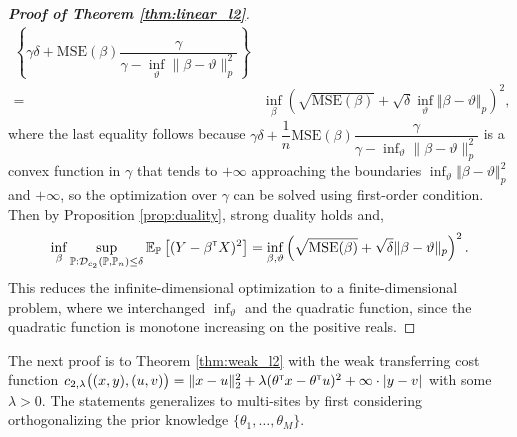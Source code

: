 \documentclass[12pt]{article}
\begin{document}
\begin{proof}[\textbf{Proof of Theorem \ref{thm:linear_l2}}]
\begin{align*}
\left\{
\gamma \delta + \text{MSE}(\beta) \dfrac{ \gamma}{\gamma - \inf_\vartheta \lVert \beta - \vartheta \rVert_p^2}
\right\}\\
=&\inf_\beta \left(\sqrt{\text{MSE}(\beta)} + \sqrt{\delta}\inf_\vartheta \Vert \beta-\vartheta\Vert_p\right)^2,
\end{align*}where the last equality follows because $\gamma \delta + \dfrac{1}{n} \text{MSE}(\beta) \dfrac{ \gamma}{\gamma - \inf_\vartheta \lVert \beta - \vartheta \rVert_p^2}$ is a convex function in $\gamma$ that tends to $+\infty$ approaching the boundaries $\inf_\vartheta \Vert \beta-\vartheta\Vert_p^2$ and $+\infty$, so the optimization over $\gamma$ can be solved using first-order condition. Then by Proposition \ref{prop:duality}, strong duality holds and, \[\inf_{\beta} \sup_{\mathbb{P}:\mathcal{D}_{c_2}(\mathbb{P},\mathbb{P}_n)\leq \delta} \mathbb{E}_{\mathbb{P}}\left[(Y-\beta^{\scriptscriptstyle \sf T} X)^2\right] = \inf_{\beta,\vartheta}\left(\sqrt{\text{MSE}(\beta)} + \sqrt{\delta} \Vert \beta-\vartheta\Vert_p\right)^2.\]
This reduces the infinite-dimensional optimization to a finite-dimensional problem, where we interchanged $\inf_\vartheta$ and the quadratic function, since the quadratic function is monotone increasing on the positive reals.
\end{proof}

The next proof is to Theorem \ref{thm:weak_l2} with the weak transferring cost function $c_{2,\lambda}\big((x,y),(u,v) \big) = \Vert x-u\Vert_2^2 + \lambda (\theta^{\scriptscriptstyle \sf T} x - \theta^{\scriptscriptstyle \sf T} u)^2 + \infty \cdot |y-v|$ with some $\lambda>0$. The statements generalizes to multi-sites by first considering orthogonalizing the prior knowledge $\{\theta_1,\ldots,\theta_M\}$.
\end{document}
